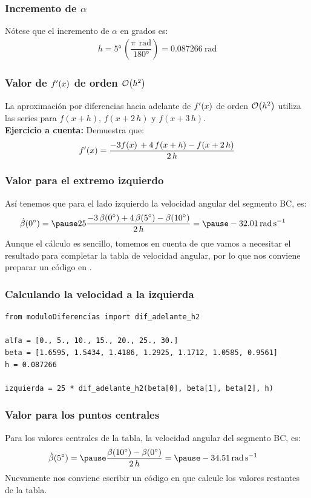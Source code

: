 \documentclass[12pt]{beamer}
\begin{document}
\begin{frame}
\frametitle{Incremento de $\alpha$}
Nótese que el incremento de $\alpha$ en grados es:
\pause
\begin{align*}
h = \ang{5} \, \left( \dfrac{\pi \, \SI{}{\radian}}{\ang{180}} \right) = \SI{0.087266}{\radian}
\end{align*}
\end{frame}
\begin{frame}
\frametitle{Valor de ${f}^{\prime} (x)$ de orden $\order{h^{2}}$}
La aproximación por diferencias hacia adelante de ${f}^{\prime} (x)$ de orden $\order{h^{2}}$ utiliza las series para $f (x + h)$, $f (x + 2 \, h)$ y $f (x + 3 \, h)$.
\\
\bigskip
\pause
\textbf{Ejercicio a cuenta:} Demuestra que:
\begin{align*}
{f}^{\prime} (x) = \dfrac{- 3 f (x) \, + 4 \, f (x + h) - f (x + 2 \, h)}{2 \, h}
\end{align*}
\end{frame}
\begin{frame}
\frametitle{Valor para el extremo izquierdo}
Así tenemos que para el lado izquierdo la velocidad angular del segmento BC, es: 
\pause
\begin{eqnarray*}
\begin{aligned}
\dot{\beta}(\ang{0}) &=  \pause 25 \dfrac{- 3 \, \beta(\ang{0}) + 4 \, \beta(\ang{5}) - \beta(\ang{10})}{2 \, h} = \pause \SI{-32.01}{\radian\per\second}
\end{aligned}
\end{eqnarray*}
\pause
Aunque el cálculo es sencillo, tomemos en cuenta de que vamos a necesitar el resultado para completar la tabla de velocidad angular, por lo que nos conviene preparar un código en \python.
\end{frame}
\begin{frame}[fragile]
\frametitle{Calculando la velocidad a la izquierda}
\begin{lstlisting}[caption=Código para calcular la velocidad angular en el extremo izquierdo]
from moduloDiferencias import dif_adelante_h2

alfa = [0., 5., 10., 15., 20., 25., 30.]
beta = [1.6595, 1.5434, 1.4186, 1.2925, 1.1712, 1.0585, 0.9561]
h = 0.087266

izquierda = 25 * dif_adelante_h2(beta[0], beta[1], beta[2], h)
\end{lstlisting}
\end{frame}
\begin{frame}
\frametitle{Valor para los puntos centrales}
Para los valores centrales de la tabla, la velocidad angular del segmento BC, es:
\pause
\begin{eqnarray*}
\begin{aligned}
\dot{\beta}(\ang{5}) &= \pause \dfrac{\beta(\ang{10})- \beta(\ang{0})}{2 \, h} = \pause \SI{-34.51}{\radian\per\second}
\end{aligned}
\end{eqnarray*}
\pause
Nuevamente nos conviene escribir un código en \python{} que calcule los valores restantes de la tabla.
\end{frame}
\end{document}
